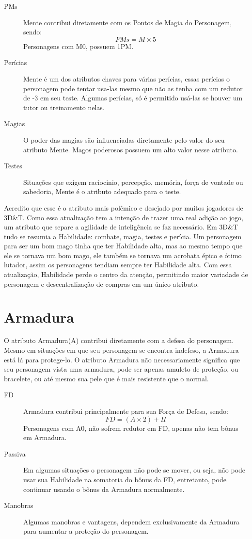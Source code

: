 \begin{description}
\item[PMs] Mente contribui diretamente com os Pontos de Magia do Personagem, sendo:
\[PMs = M \times 5 \]
Personagens com M0, possuem 1PM.
\item[Perícias] Mente é um dos atributos chaves para várias perícias, essas perícias o personagem pode tentar usa-las mesmo que não as tenha com um redutor de -3 em seu teste. Algumas perícias, só é permitido usá-las se houver um tutor ou treinamento nelas.
\item[Magias] O poder das magias são influenciadas diretamente pelo valor do seu atributo Mente. Magos poderosos possuem um alto valor nesse atributo.
\item[Testes] Situações que exigem raciocinio, percepção, memória, força de vontade ou sabedoria, Mente é o atributo adequado para o teste.
\end{description}

\begin{framed}
Acredito que esse é o atributo mais polêmico e desejado por muitos jogadores de 3D\&T. Como essa atualização tem a intenção de trazer uma real adição ao jogo, um atributo que separe a agilidade de inteligência se faz necessário. Em 3D\&T tudo se resumia a Habilidade: combate, magia, testes e perícia. Um personagem para ser um bom mago tinha que ter Habilidade alta, mas ao mesmo tempo que ele se tornava um bom mago, ele também se tornava um acrobata épico e ótimo lutador, assim os personagens tendiam sempre ter Habilidade alta. Com essa atualização, Habilidade perde o centro da atenção, permitindo maior variadade de personagem e descentralização de compras em um único atributo.
\end{framed}

\section{Armadura}
O atributo Armadura(A) contribui diretamente com a defesa do personagem. Mesmo em situações em que seu personagem se encontra indefeso, a Armadura está lá para protege-lo. O atributo Armadura não necessariamente significa que seu personagem vista uma armadura, pode ser apenas amuleto de proteção, ou bracelete, ou até mesmo sua pele que é mais resistente que o normal.

\begin{description}
\item[FD] Armadura contribui principalmente para sua Força de Defesa, sendo:
\[ FD = (A \times 2) + H \]
Personagens com A0, não sofrem redutor em FD, apenas não tem bônus em Armadura.
\item[Passiva] Em algumas situações o personagem não pode se mover, ou seja, não pode usar sua Habilidade na somatoria do bônus da FD, entretanto, pode continuar usando o bônus da Armadura normalmente.
\item[Manobras] Algumas manobras e vantagens, dependem exclusivamente da Armadura para aumentar a proteção do personagem. 
\end{description}

